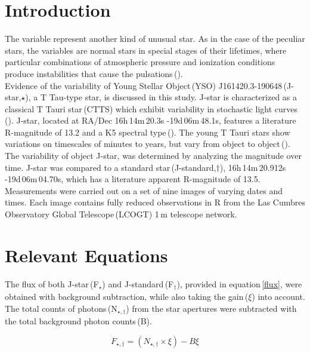 \documentclass[onecolumn]{aastex6}
\begin{document}
\section{Introduction}
The variable represent another kind of unusual star. As in the case of the peculiar stars, the variables are normal stars in special stages of their lifetimes, where particular combinations of atmospheric pressure and ionization conditions produce instabilities that cause the pulsations\,(\cite{1}).
\\
\indent Evidence of the variability of Young Stellar Object\,(YSO) J161420.3-190648\,(J-star,$\star$), a T Tau-type star, is discussed in this study. J-star is characterized as a classical T Tauri star\,(CTTS) which exhibit variability in stochastic light curves\,(\cite{2}). J-star, located at RA/Dec 16h\,14m\,20.3s -19d\,06m\,48.1s, features a literature R-magnitude of 13.2 and a K5 spectral type\,(\cite{3}). The young T Tauri stars show variations on timescales of minutes to years, but vary from object to object\,(\cite{6}). 
\\
\indent The variability of object J-star, was determined by analyzing the magnitude over time. J-star was compared to a standard star\,(J-standard,$\dagger$), 16h\,14m\,20.912s -19d\,06m\,04.70s, which has a literature apparent R-magnitude of 13.5. Measurements were carried out on a set of nine images of varying dates and times. Each image contains fully reduced observations in R from the Las Cumbres Observatory Global Telescope\,(LCOGT) 1\,m telescope network.


\section{Relevant Equations}
\indent The flux of both J-star\,(F$_{\star}$) and J-standard\,(F$_{\dagger}$), provided in equation\,\ref{flux}, were obtained with background subtraction, while also taking the gain\,($\xi$) into account. The total counts of photons\,(N$_{\star,\dagger}$) from the star apertures were subtracted with the total background photon counts\,(B).

\begin{equation}
F_{\star,\dagger} = (N_{\star,\dagger}\times \xi) - B\xi
\label{flux}
\end{equation}
\end{document}
